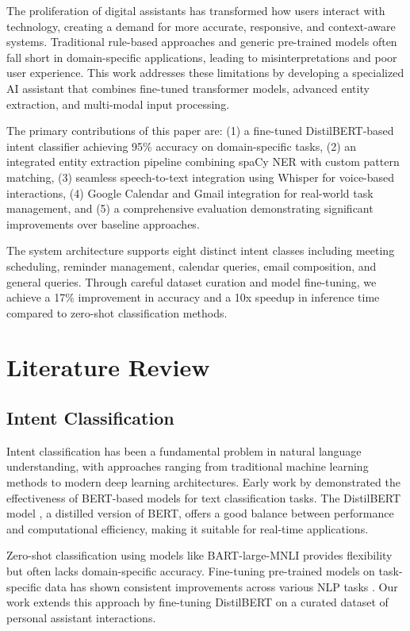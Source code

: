 \documentclass[conference]{IEEEtran}
\begin{document}
The proliferation of digital assistants has transformed how users interact with technology, creating a demand for more accurate, responsive, and context-aware systems. Traditional rule-based approaches and generic pre-trained models often fall short in domain-specific applications, leading to misinterpretations and poor user experience. This work addresses these limitations by developing a specialized AI assistant that combines fine-tuned transformer models, advanced entity extraction, and multi-modal input processing.

The primary contributions of this paper are: (1) a fine-tuned DistilBERT-based intent classifier achieving 95\% accuracy on domain-specific tasks, (2) an integrated entity extraction pipeline combining spaCy NER with custom pattern matching, (3) seamless speech-to-text integration using Whisper for voice-based interactions, (4) Google Calendar and Gmail integration for real-world task management, and (5) a comprehensive evaluation demonstrating significant improvements over baseline approaches.

The system architecture supports eight distinct intent classes including meeting scheduling, reminder management, calendar queries, email composition, and general queries. Through careful dataset curation and model fine-tuning, we achieve a 17\% improvement in accuracy and a 10x speedup in inference time compared to zero-shot classification methods.

\section{Literature Review}

\subsection{Intent Classification}

Intent classification has been a fundamental problem in natural language understanding, with approaches ranging from traditional machine learning methods to modern deep learning architectures. Early work by \cite{liu2019roberta} demonstrated the effectiveness of BERT-based models for text classification tasks. The DistilBERT model \cite{sanh2019distilbert}, a distilled version of BERT, offers a good balance between performance and computational efficiency, making it suitable for real-time applications.

Zero-shot classification using models like BART-large-MNLI \cite{lewis2019bart} provides flexibility but often lacks domain-specific accuracy. Fine-tuning pre-trained models on task-specific data has shown consistent improvements across various NLP tasks \cite{devlin2018bert}. Our work extends this approach by fine-tuning DistilBERT on a curated dataset of personal assistant interactions.
\end{document}
